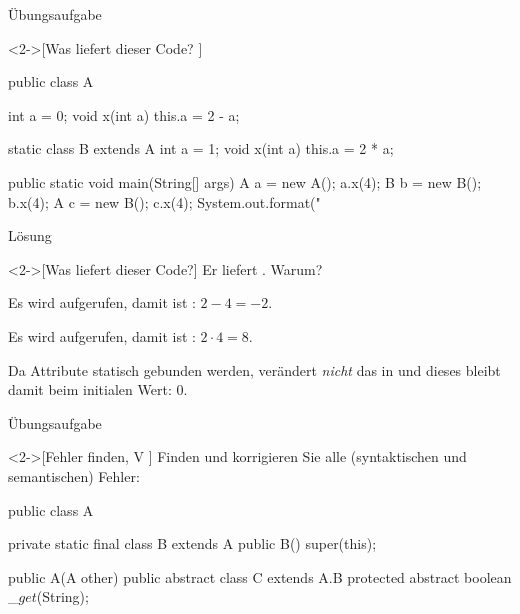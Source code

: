 \begin{frame}[c,fragile]{Übungsaufgabe}
    \begin{exercise}<2->[Was liefert dieser Code? ]\label{tsk:java-bindings-result}
\begin{plainjava}[morekeywords={[3]{A,B}},aboveskip=0pt,belowskip=0pt]
public class A {
    int a = 0;
    void x(int a) { this.a = 2 - a; }

    static class B extends A {
        int a = 1;
        void x(int a) { this.a = 2 * a; }
    }

    public static void main(String[] args) {
        A a = new A(); a.x(4);
        B b = new B(); b.x(4);
        A c = new B(); c.x(4);
        System.out.format("%
    }
}
\end{plainjava}
    \end{exercise}
\end{frame}

\begin{frame}[c]{Lösung}
    \begin{solve}<2->[Was liefert dieser Code?]
        Er liefert . Warum?
        \begin{description}[XX:]
            \item[-2] Es wird  aufgerufen, damit ist : \(2 - 4 = -2\).
            \item[8] Es wird  aufgerufen, damit ist : \(2 \cdot 4 = 8\).
            \item[0] Da Attribute statisch gebunden werden, verändert  \emph{nicht} das  in  und dieses bleibt damit beim initialen Wert: \(0\).
        \end{description}
    \end{solve}
\end{frame}



\begin{frame}[c,fragile]{Übungsaufgabe}
    \begin{exercise}<2->[Fehler finden, V ]
        \pause{}Finden und korrigieren Sie alle (syntaktischen und semantischen) Fehler:\pause{}
{\footnotesize
        \begin{plainvoid}
public class A {
    private static final class B extends A {
        public B() {
            super(this);
        }
    }

    public A(A other){}
    public abstract class C extends A.B {
        protected abstract boolean _$get$(String);
    }
}
        \end{plainvoid}
}
    \end{exercise}
\end{frame}

